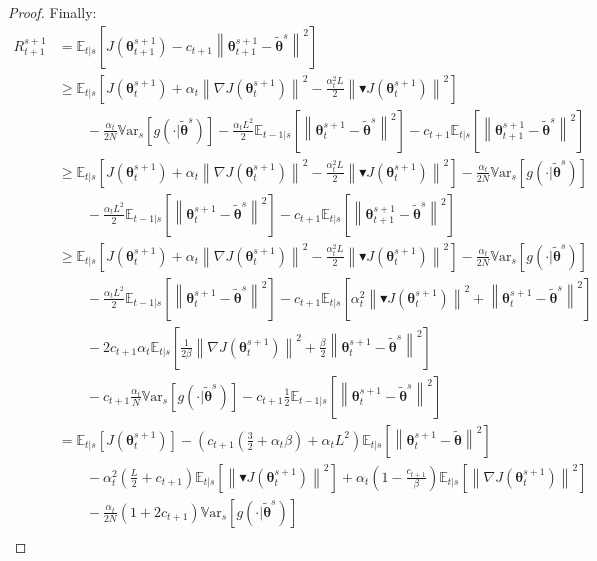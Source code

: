 \documentclass{article}
\theoremstyle{remark}
\theoremstyle{definition}
\newcommand{\norm}[2][\infty]{\left\|#2\right\|_{#1}}
\newcommand{\vtheta}{\boldsymbol{\theta}}
\newcommand{\gradJ}[1]{\nabla J(#1)}
\newcommand{\Ets}[2][t]{\mathbb{E}_{#1\vert s}\left[#2\right]}
\newcommand{\Vars}[1]{{\mathbb{V}\text{ar}}_{s}\left[#1\right]}
\newcommand{\gradBlack}[1]{\blacktriangledown J(#1)}
\begin{document}
\begin{proof}
Finally:
\begin{align}
	R_{t+1}^{s+1} &= \Ets{J(\vtheta_{t+1}^{s+1}) - c_{t+1}\norm[]{\vtheta_{t+1}^{s+1}-\tilde{\vtheta}^s}^2} \nonumber\\
	&\geq	\Ets{J(\vtheta_t^{s+1})+\alpha_t\norm[]{\gradJ{\vtheta_t^{s+1}}}^2 - \frac{\alpha_t^2L}{2}\norm[]{\gradBlack{\vtheta_t^{s+1}}}^2} \nonumber\\
	&\qquad-
	\frac{\alpha_t}{2N}\Vars{g(\cdot\vert\tilde{\vtheta}^s)} -\frac{\alpha_tL^2}{2}\Ets[t-1]{\norm[]{\vtheta_t^{s+1} - \tilde{\vtheta}^s}^2}
	-c_{t+1}\Ets{\norm[]{\vtheta_{t+1}^{s+1}-\tilde{\vtheta}^s}^2} \label{eq:17}\\
	&\geq \Ets{J(\vtheta_t^{s+1})+\alpha_t\norm[]{\gradJ{\vtheta_t^{s+1}}}^2 - \frac{\alpha_t^2L}{2}\norm[]{\gradBlack{\vtheta_t^{s+1}}}^2} 
	-\frac{\alpha_t}{2N}\Vars{g(\cdot\vert\tilde{\vtheta}^s)} \nonumber\\
	&\qquad -\frac{\alpha_tL^2}{2}\Ets[t-1]{\norm[]{\vtheta_t^{s+1} - \tilde{\vtheta}^s}^2}
	-c_{t+1}\Ets{\norm[]{\vtheta_{t+1}^{s+1}-\tilde{\vtheta}^s}^2} \nonumber\\
	&\geq \Ets{J(\vtheta_t^{s+1})+\alpha_t\norm[]{\gradJ{\vtheta_t^{s+1}}}^2 - \frac{\alpha_t^2L}{2}\norm[]{\gradBlack{\vtheta_t^{s+1}}}^2} 
	-\frac{\alpha_t}{2N}\Vars{g(\cdot\vert\tilde{\vtheta}^s)} \nonumber\\
	&\qquad -\frac{\alpha_tL^2}{2}\Ets[t-1]{\norm[]{\vtheta_t^{s+1} - \tilde{\vtheta}^s}^2} -c_{t+1}\Ets{\alpha_t^2\norm[]{\gradBlack{\vtheta_t^{s+1}}}^2+\norm[]{\vtheta_t^{s+1}-\tilde{\vtheta}^s}^2}
	\nonumber\\
	&\qquad-2c_{t+1}\alpha_t\Ets{\frac{1}{2\beta}\norm[]{\gradJ{\vtheta_t^{s+1}}}^2+\frac{\beta}{2}\norm[]{\vtheta_t^{s+1}-\tilde{\vtheta}^s}^2} \nonumber\\ 
	&\qquad
	-c_{t+1}\frac{\alpha_t}{N}\Vars{g(\cdot\vert\tilde{\vtheta}^s)} -c_{t+1}\frac{1}{2}\Ets[t-1]{\norm[]{\vtheta_t^{s+1}-\tilde{\vtheta}^s}^2} \label{eq:18}\\
	&= \Ets{J(\vtheta_t^{s+1})} - \left(c_{t+1}\left(\frac{3}{2}+\alpha_t\beta\right)+\alpha_tL^2\right)\Ets{\norm[]{\vtheta_{t}^{s+1}-\tilde{\vtheta}}^2} \nonumber\\
	&\qquad-\alpha_t^2\left(\frac{L}{2}+c_{t+1}\right)\Ets{\norm[]{\gradBlack{\vtheta_t^{s+1}}}^2}
	+\alpha_t\left(1-\frac{c_{t+1}}{\beta}\right)\Ets{\norm[]{\gradJ{\vtheta_t^{s+1}}}^2} \nonumber\\
	&\qquad-\frac{\alpha_t}{2N}\left(1+2c_{t+1}\right)\Vars{g(\cdot\vert\tilde{\vtheta}^s)} \nonumber\\

\end{align}
\end{proof}
\end{document}
